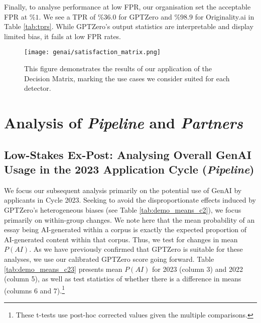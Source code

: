 Finally, to analyse performance at low FPR, our organisation set the acceptable FPR at $\%1$. We see a TPR of $\%36.0$ for GPTZero and $\%98.9$ for Originality.ai in Table \ref{tab:tprs}. While GPTZero's output statistics are interpretable and display limited bias, it fails at low FPR rates.

\begin{figure}[htbp]
  \centering
  \texttt{[image: genai/satisfaction\_matrix.png]}
  \caption{This figure demonstrates the results of our application of the Decision Matrix, marking the use cases we consider suited for each detector.}
  \label{fig:satisfaction_matrix}
\end{figure}

\section{Analysis of \emph{Pipeline} and \emph{Partners}}\label{ssec:decisions}

\subsection{Low-Stakes Ex-Post: Analysing Overall GenAI Usage in the 2023 Application Cycle (\emph{Pipeline})}
We focus our subsequent analysis primarily on the potential use of GenAI by applicants in Cycle 2023. Seeking to avoid the disproportionate effects induced by GPTZero's heterogeneous biases (see Table \ref{tab:demo_means_c2}), we focus primarily on within-group changes. We note here that the mean probability of an essay being AI-generated within a corpus is exactly the expected proportion of AI-generated content within that corpus. Thus, we test for changes in mean $P(AI)$. As we have previously confirmed that GPTZero is suitable for these analyses, we use our calibrated GPTZero score going forward. Table \ref{tab:demo_means_c23} presents mean $P(AI)$ for 2023 (column 3) and 2022 (column 5), as well as test statistics of whether there is a difference in means (columns 6 and 7).\footnote{These t-tests use post-hoc corrected values given the multiple comparisons.}


